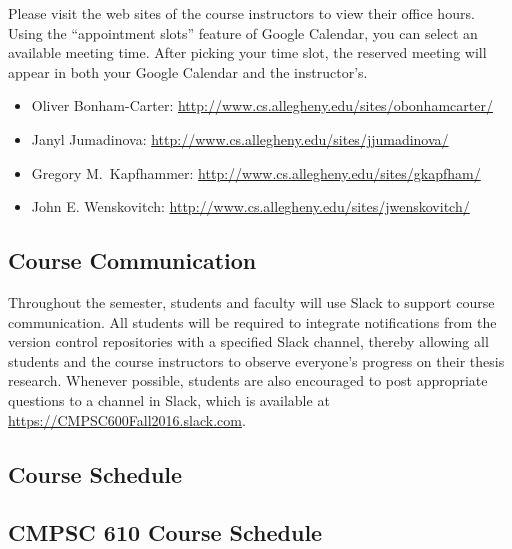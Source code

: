Please visit the web sites of the course instructors to view their office hours. Using the ``appointment slots'' feature
of Google Calendar, you can select an available meeting time. After picking your time slot, the reserved meeting will
appear in both your Google Calendar and the instructor's.

\vspace*{-.1in}
\begin{itemize}
    \itemsep -.25em
        \item Oliver Bonham-Carter: \url{http://www.cs.allegheny.edu/sites/obonhamcarter/}
        \item Janyl Jumadinova: \url{http://www.cs.allegheny.edu/sites/jjumadinova/}
        \item Gregory M.\ Kapfhammer: \url{http://www.cs.allegheny.edu/sites/gkapfham/}
        \item John E. Wenskovitch: \url{http://www.cs.allegheny.edu/sites/jwenskovitch/}
\end{itemize}

\vspace*{-.25in}
\subsection*{Course Communication}

Throughout the semester, students and faculty will use Slack to support course communication. All students will be
required to integrate notifications from the version control repositories with a specified Slack channel, thereby
allowing all students and the course instructors to observe everyone's progress on their thesis research.  Whenever
possible, students are also encouraged to post appropriate questions to a channel in Slack, which is available at
\url{https://CMPSC600Fall2016.slack.com}.

\vspace*{-.1in}
\subsection*{Course Schedule}

\vspace*{-.1in}
\subsection*{CMPSC 610 Course Schedule}

